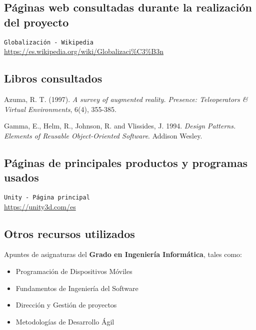 
\subsection*{Páginas web consultadas durante la realización del proyecto}

 {\tt Globalización - Wikipedia}\\
\url{https://es.wikipedia.org/wiki/Globalizaci%C3%B3n}

\subsection*{Libros consultados}

Azuma, R. T. (1997). {\em A survey of augmented reality. Presence: Teleoperators & Virtual Environments}, 6(4), 355-385.

Gamma, E., Helm, R., Johnson, R. and Vlissides, J. 1994. {\em Design Patterns. Elements of Reusable Object-Oriented Software}. Addison Wesley.

\subsection*{Páginas de principales productos y programas usados}

 {\tt Unity - Página principal}\\
\url{https://unity3d.com/es}

\subsection*{Otros recursos utilizados}

Apuntes de asignaturas del \textbf{Grado en Ingeniería Informática}, tales como:
\begin{itemize}
    \item Programación de Dispositivos Móviles
    \item Fundamentos de Ingeniería del Software
    \item Dirección y Gestión de proyectos
    \item Metodologías de Desarrollo Ágil
\end{itemize}
